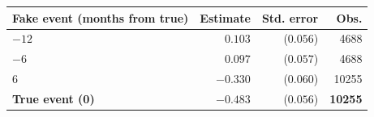 \begin{tabular}{lrrr}
\toprule
Fake event (months from true) & Estimate & Std. error & Obs. \\
\midrule
$-12$ & $0.103$ & ($0.056$) & 4688 \\
$-6$ & $0.097$ & ($0.057$) & 4688 \\
$6$ & $-0.330$ & ($0.060$) & 10255 \\
\midrule
\textbf{True event (0)} & $\mathbf{-0.483}$ & ($\mathbf{0.056}$) & \textbf{10255} \\
\bottomrule
\end{tabular}
